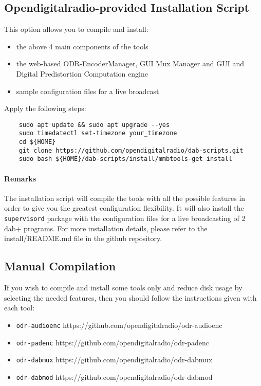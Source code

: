 \subsection{Opendigitalradio-provided Installation Script}
This option allows you to compile and install:
\begin{itemize}
    \item the above 4 main components of the tools

    \item the web-based ODR-EncoderManager, GUI Mux Manager and GUI and Digital
        Predistortion Computation engine
    \item sample configuration files for a live broadcast
\end{itemize}

Apply the following steps:
\begin{lstlisting}
    sudo apt update && sudo apt upgrade --yes
    sudo timedatectl set-timezone your_timezone
    cd ${HOME}
    git clone https://github.com/opendigitalradio/dab-scripts.git
    sudo bash ${HOME}/dab-scripts/install/mmbtools-get install
\end{lstlisting}

\paragraph{Remarks}
The installation script will compile the tools with all the possible features
in order to give you the greatest configuration flexibility. It will also
install the \texttt{supervisord} package with the configuration files for
a live broadcasting of 2 dab+ programs. For more installation details, please
refer to the install/README.md file in the github repository.

\subsection{Manual Compilation}
If you wish to compile and install some tools only and reduce disk usage by
selecting the needed features, then you should follow the instructions given
with each tool:

\begin{itemize}
    \item \texttt{odr-audioenc} https://github.com/opendigitalradio/odr-audioenc
    \item \texttt{odr-padenc} https://github.com/opendigitalradio/odr-padenc
    \item \texttt{odr-dabmux} https://github.com/opendigitalradio/odr-dabmux
    \item \texttt{odr-dabmod} https://github.com/opendigitalradio/odr-dabmod
\end{itemize}

